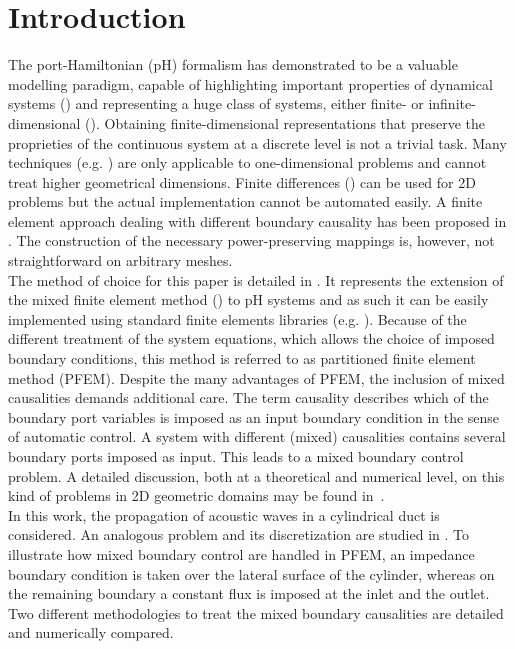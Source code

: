\documentclass{ifacconf}
\begin{document}
\section{Introduction}
The port-Hamiltonian (pH) formalism has demonstrated to be a valuable modelling paradigm, capable of highlighting important properties of dynamical systems (\cite{bookPHs}) and representing a huge class of systems, either finite- or infinite-dimensional (\cite{VANDERSCHAFT2002}). Obtaining finite-dimensional representations that preserve the proprieties of the continuous system at a discrete level is not a trivial task. Many techniques (e.g. \cite{moulla:hal-01625008}) are only applicable to one-dimensional problems and cannot treat higher geometrical dimensions. Finite differences (\cite{Trenchant}) can be used for 2D problems but the actual implementation cannot be automated easily. A finite element approach dealing with different boundary causality has been proposed in \cite{WeakForm_Kot}. The construction of the necessary power-preserving mappings is, however, not straightforward on arbitrary meshes.  \\

The method of choice for this paper is detailed in \cite{cardoso2019partitioned}. It represents the extension of the mixed finite element method (\cite{Gatica}) to pH systems and as such it can be easily implemented using standard finite elements libraries (e.g. \cite{LoggMardalEtAl2012}). Because of the different treatment of the system equations, which allows the choice of imposed boundary conditions, this method is referred to as partitioned finite element method (PFEM). Despite the many advantages of PFEM, the inclusion of mixed causalities demands additional care. The term causality describes which of the boundary port variables is imposed as an input boundary condition in the sense of automatic control. A system with different (mixed) causalities contains several boundary ports imposed as input. This leads to a mixed boundary control problem. A detailed discussion, both at a theoretical and numerical level, on this kind of problems in 2D geometric domains may be found in~\cite{Grisvard}.\\

In this work, the propagation of acoustic waves in a cylindrical duct is considered. An analogous problem and its discretization are studied in \cite{WU2015206}. To illustrate how mixed boundary control are handled in PFEM, an impedance boundary condition is taken over the lateral surface of the cylinder, whereas on the remaining boundary a constant flux is imposed at the inlet and the outlet. Two different methodologies to treat the mixed boundary causalities are detailed and numerically compared.   \\
\end{document}
